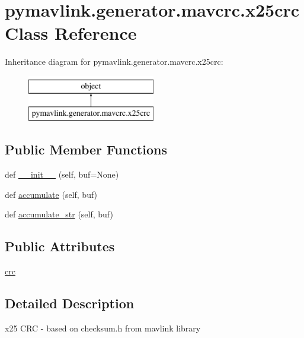 \hypertarget{classpymavlink_1_1generator_1_1mavcrc_1_1x25crc}{}\section{pymavlink.\+generator.\+mavcrc.\+x25crc Class Reference}
\label{classpymavlink_1_1generator_1_1mavcrc_1_1x25crc}
Inheritance diagram for pymavlink.\+generator.\+mavcrc.\+x25crc\+:\begin{figure}[H]
\begin{center}
\leavevmode
\includegraphics[height=2.000000cm]{classpymavlink_1_1generator_1_1mavcrc_1_1x25crc}
\end{center}
\end{figure}
\subsection*{Public Member Functions}
\begin{DoxyCompactItemize}
\item 
def \mbox{\hyperlink{classpymavlink_1_1generator_1_1mavcrc_1_1x25crc_ad5f749f0713c4fe42e5bca6eddda7346}{\+\_\+\+\_\+init\+\_\+\+\_\+}} (self, buf=None)
\item 
def \mbox{\hyperlink{classpymavlink_1_1generator_1_1mavcrc_1_1x25crc_ae5f82c53cc694c92a3f612e06e259ae6}{accumulate}} (self, buf)
\item 
def \mbox{\hyperlink{classpymavlink_1_1generator_1_1mavcrc_1_1x25crc_a47f2140fb2e08dae2f4315c86f5c2216}{accumulate\+\_\+str}} (self, buf)
\end{DoxyCompactItemize}
\subsection*{Public Attributes}
\begin{DoxyCompactItemize}
\item 
\mbox{\hyperlink{classpymavlink_1_1generator_1_1mavcrc_1_1x25crc_a231ac18f30e05e9a81d95534925a318b}{crc}}
\end{DoxyCompactItemize}


\subsection{Detailed Description}
\begin{DoxyVerb}x25 CRC - based on checksum.h from mavlink library\end{DoxyVerb}
 

